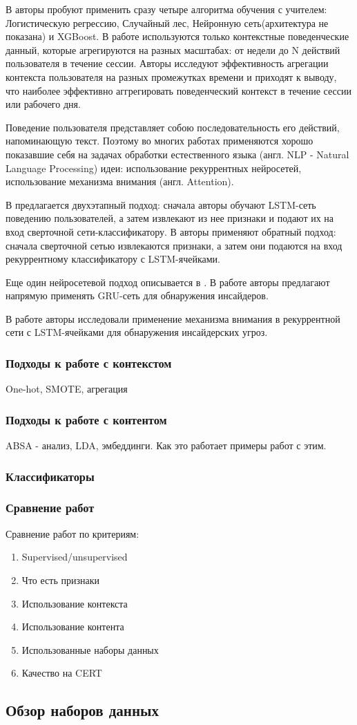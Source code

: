 В \cite{granual} авторы пробуют применить сразу четыре алгоритма обучения с учителем: Логистическую регрессию, Случайный лес, Нейронную сеть(архитектура не показана) и XGBoost. В работе используются только контекстные поведенческие данный, которые агрегируются на разных масштабах: от недели до N действий пользователя в течение сессии. Авторы исследуют эффективность агрегации контекста пользователя на разных промежутках времени и приходят к выводу, что наиболее эффективно аггрегировать поведенческий контекст в течение сессии или рабочего дня.

Поведение пользователя представляет собою последовательность его действий, напоминающую текст. Поэтому во многих работах применяются хорошо показавшие себя на задачах обработки естественного языка (англ. NLP - Natural Language Processing) идеи: использование рекуррентных нейросетей, использование механизма внимания (англ. Attention).  

В \cite{lstm_cnn} предлагается двухэтапный подход: сначала авторы обучают LSTM-сеть поведению пользователей, а затем извлекают из нее признаки и подают их на вход сверточной сети-классификатору.
В \cite{cnn_lstm} авторы применяют обратный подход: сначала сверточной сетью извлекаются признаки, а затем они подаются на вход рекуррентному классификатору с LSTM-ячейками. 

Еще один нейросетевой подход описывается в \cite{gru}. В работе авторы предлагают напрямую применять GRU-сеть для обнаружения инсайдеров.

В работе \cite{attention} авторы исследовали применение механизма внимания в рекуррентной сети с LSTM-ячейками для обнаружения инсайдерских угроз. 

\subsubsection{Подходы к работе с контекстом}
One-hot, SMOTE\cite{cnn_lstm}, агрегация

\subsubsection{Подходы к работе с контентом}
ABSA - анализ, LDA, эмбеддинги. Как это работает примеры работ с этим.

\subsubsection{Классификаторы}

\subsubsection{Сравнение работ}
Сравнение работ по критериям:
\begin{enumerate}
\item Supervised/unsupervised
\item Что есть признаки
\item Использование контекста
\item Использование контента
\item Использованные наборы данных
\item Качество на CERT
\end{enumerate}

\subsection{Обзор наборов данных}
\label{sec:sample}
\clearpage
